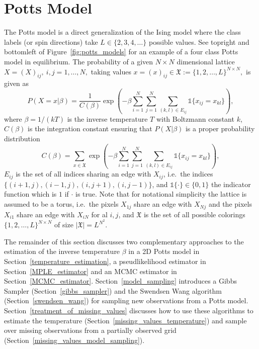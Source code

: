 \documentclass[12pt, twoside]{article}
\newcommand{\1}{\mathbb{1}}
\begin{document}
\section{Potts Model}\label{potts_model}
The Potts model is a direct generalization of the Ising model where the class labels (or spin directions) take $L \in \{2, 3, 4, \ldots\}$ possible values. 
See topright and bottomleft of Figure~\ref{fig:potts_models} for an example of a four class Potts model in equilibrium.
The probability of a given $N \times N$ dimensional lattice $X = (X)_{ij},\ i, j = 1, \ldots, N,$ taking values $x = (x)_{ij} \in \mathfrak X := \{1, 2, \ldots, L\}^{N \times N},$ is given as
\begin{equation}
P(X = x | \beta) = \frac{1}{C(\beta)} \exp \left(-\beta \sum_{i = 1}^N \sum_{j = 1}^N \sum_{(k,l) \in E_{ij}} \1 \{x_{ij} = x_{kl}\}\right),
\end{equation}
where $\beta = 1 / (k T)$ is the inverse temperature $T$ with Boltzmann constant $k$, $C(\beta)$ is the integration constant ensuring that $P(X|\beta)$ is a proper probability distribution
\begin{equation} \label{eq:cbeta}
C(\beta) = \sum_{x \in \mathfrak X} \exp \left(-\beta \sum_{i = 1}^N \sum_{j = 1}^N \sum_{(k,l) \in E_{ij}} \1 \{x_{ij} = x_{kl}\}\right), 
\end{equation}
$E_{ij}$ is the set of all indices sharing an edge with $X_{ij}$, i.e.\ the indices $\{(i + 1, j), (i - 1, j), (i, j + 1), (i, j - 1)\}$, and $\1\{\cdot\} \in\{0, 1\}$ the indicator function which is $1$ if $\cdot$ is true. Note that for notational simplicity the lattice is assumed to be a torus, i.e.\ the pixels $X_{1j}$ share an edge with $X_{Nj}$ and the pixels $X_{i1}$ share an edge with $X_{iN}$ for al $i, j$, and $\mathfrak X$ is the set of all possible colorings $\{1, 2, \ldots, L\}^{N \times N}$ of size $|\mathfrak X| = L^{N^2}$.

The remainder of this section discusses two complementary approaches to the estimation of the inverse temperature $\beta$ in a 2D Potts model in Section~\ref{temperature_estimation}, a pseudlikelihood estimator in Section~\ref{MPLE_estimator} and an MCMC estimator in Section~\ref{MCMC_estimator}. Section~\ref{model_sampling} introduces a Gibbs Sampler (Section~\ref{gibbs_sampler}) and the Swendsen Wang algorithm (Section~\ref{swendsen_wang}) for sampling new observations from a Potts model.
Section~\ref{treatment_of_missing_values} discusses how to use these algorithms to estimate the temperature (Section~\ref{missing_values_temperature}) and sample over missing observations from a partially observed grid (Section~\ref{missing_values_model_sampling}).
\end{document}
